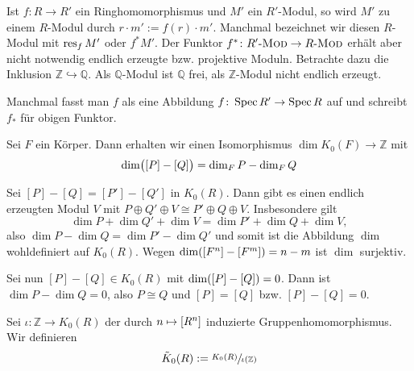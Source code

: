 \begin{bemerkung}[{name=[{kontravarianter Funktor}]}]
	Ist $f \colon R \to R'$ ein Ringhomomorphismus und $M'$ ein $R'$-Modul, so wird $M'$ zu einem $R$-Modul durch $r \cdot m' := f(r) \cdot m'$.
	Manchmal bezeichnet wir diesen $R$-Modul mit $\res_f M'$ oder $f^* M'$.
	Der Funktor $f^* \colon R'\text{-}\MOD \to R\text{-}\MOD$ erhält aber nicht notwendig endlich erzeugte bzw. projektive Moduln.
	Betrachte dazu die Inklusion $\mathbb{Z} \hookrightarrow \mathbb{Q}$. 
	Als $\mathbb{Q}$-Modul ist $\mathbb{Q}$ frei, als $\mathbb{Z}$-Modul nicht endlich erzeugt.
	
	Manchmal fasst man $f$ als eine Abbildung $f \colon \Spec R' \to \Spec R$ auf und schreibt $f_*$ für obigen Funktor.
\end{bemerkung}

\begin{satz}[{name=[{K0 von einem Körper}]}]
	Sei $F$ ein Körper.
	Dann erhalten wir einen Isomorphismus $\dim K_0(F) \to \mathbb{Z}$ mit 
	\[
		\dim\enbrace[\big]{[P]- [Q]} = \dim_F P - \dim_F Q
	\]
\end{satz}
\begin{beweis}
	Sei $[P]- [Q] = [P']- [Q']$ in $K_0(R)$.
	Dann gibt es einen endlich erzeugten Modul $V$ mit $P \oplus Q' \oplus V \cong P' \oplus Q \oplus V$.
	Insbesondere gilt 
	\[
		\dim P + \dim Q' + \dim V = \dim P' + \dim Q + \dim V,
	\]
	also $\dim P - \dim Q = \dim P' - \dim Q'$ und somit ist die Abbildung $\dim$ wohldefiniert auf $K_0(R)$.
	Wegen $\dim \enbrace*{[F^n]- [F^m]} = n-m$ ist $\dim$ surjektiv.
	
	Sei nun $[P]-[Q] \in K_0(R)$ mit $\dim \enbrace*{[P]- [Q]}=0$.
	Dann ist $\dim P - \dim Q =0$, also $P \cong Q$ und $[P]=[Q]$ bzw. $[P]-[Q]=0$.
\end{beweis}

\begin{definition}
	Sei $\iota \colon \mathbb{Z} \to K_0(R)$ der durch $n \mapsto \benbrace*{R^n}$ induzierte Gruppenhomomorphismus.
	Wir definieren 
	\[
		\tilde{K}_0(R) := \sfrac{K_0(R)}{\iota(\mathbb{Z})}
	\]
\end{definition}

